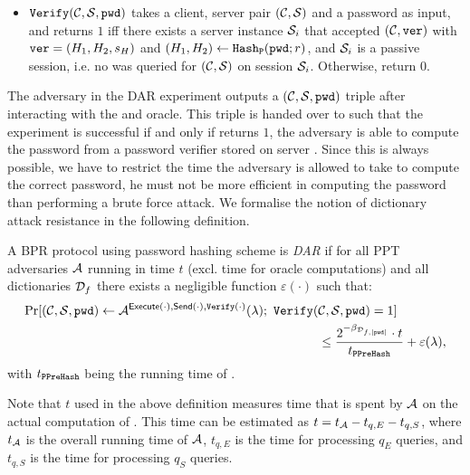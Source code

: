\begin{itemize}
  \item $\mathtt{Verify}(\mathcal{C},\mathcal{S},\mathtt{pwd})$ takes a client, server pair $(\mathcal{C},\mathcal{S})$ and a password \pwd as input, and returns $1$ iff there exists a server instance $\mathcal{S}_i$ that accepted $(\mathcal{C},\mathtt{ver})$ with $\mathtt{ver}=(H_1,H_2,s_H)$ and $(H_1,H_2)\gets\mathtt{Hash_P}(\mathtt{pwd};r)$, and $\mathcal{S}_i$ is a passive session, i.e. no \Send was queried for $(\mathcal{C},\mathcal{S})$ on session $\mathcal{S}_i$.
        Otherwise, return $0$.
\end{itemize}

\noindent
The adversary in the \ac{DAR} experiment outputs a $(\mathcal{C},\mathcal{S},\mathtt{pwd})$ triple after interacting with the \Execute and \Send oracle.
This triple is handed over to \Verify such that the experiment is successful if and only if \Verify returns $1$, \ie the adversary is able to compute the password \pwd from a password verifier \ver stored on server \Server.
Since this is always possible, we have to restrict the time the adversary is allowed to take to compute the correct password, \ie he must not be more efficient in computing the password than performing a brute force attack.
We formalise the notion of dictionary attack resistance in the following definition.

\begin{definition}\label{def:dar}
A \ac{BPR} protocol using password hashing scheme \HashP is \emph{\acl{DAR}} if for all \ac{PPT} adversaries $\mathcal{A}$ running in time $t$ (excl. time for oracle computations) and all dictionaries $\mathcal{D}_f$ there exists a negligible function $\varepsilon(\cdot)$ such that:
\begin{align*}
\Pr[(\mathcal{C},\mathcal{S},\mathtt{pwd})\gets\mathcal{A}^{\mathsf{Execute}(\cdot), \mathsf{Send}(\cdot), \mathtt{Verify}(\cdot)}(\lambda);~ \mathtt{Verify}(&\mathcal{C},\mathcal{S},\mathtt{pwd})=1] \\
&  \leq \frac{2^{-\beta_{\mathcal{D}_{f,|\mathtt{pwd}|}}}\cdot t}{t_{\mathtt{PPreHash}}} + \varepsilon(\lambda),
\end{align*}
with $t_\mathtt{PPreHash}$ being the running time of \PPreHash.
\eod
\end{definition}

\noindent
Note that $t$ used in the above definition measures time that is spent by $\mathcal{A}$ on the actual computation of \pwd. 
This time can be estimated as $t=t_\mathcal{A}-t_{q,E}-t_{q,S}$, where  $t_\mathcal{A}$ is the overall running time of $\mathcal{A}$, $t_{q,E}$ is the time for processing $q_E$ \Execute queries, and $t_{q,S}$ is the time for processing $q_S$ \Send queries. 

